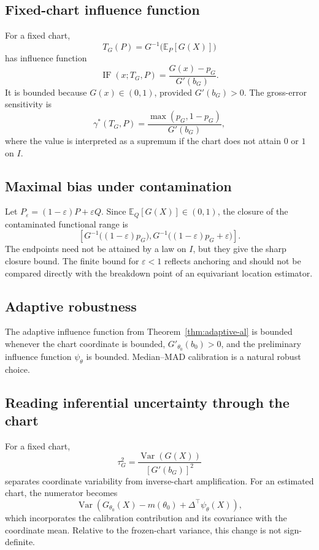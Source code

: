 \documentclass[11pt,a4paper]{article}
\theoremstyle{definition}
\newcommand{\E}{\mathbb{E}}
\newcommand{\Var}{\operatorname{Var}}
\newcommand{\IF}{\operatorname{IF}}
\begin{document}
\subsection{Fixed-chart influence function}

For a fixed chart,
\[
T_G(P)=G^{-1}\!\bigl(\E_P[G(X)]\bigr)
\]
has influence function
\[
\IF(x;T_G,P)
=
\frac{G(x)-p_G}{G'(b_G)}.
\]
It is bounded because $G(x)\in(0,1)$, provided $G'(b_G)>0$. The gross-error sensitivity is
\[
\gamma^*(T_G,P)
=
\frac{\max(p_G,1-p_G)}{G'(b_G)},
\]
where the value is interpreted as a supremum if the chart does not attain $0$ or $1$ on $I$.

\subsection{Maximal bias under contamination}

Let $P_\varepsilon=(1-\varepsilon)P+\varepsilon Q$. Since $\E_Q[G(X)]\in(0,1)$, the closure of the contaminated functional range is
\[
\left[
G^{-1}\!\bigl((1-\varepsilon)p_G\bigr),
G^{-1}\!\bigl((1-\varepsilon)p_G+\varepsilon\bigr)
\right].
\]
The endpoints need not be attained by a law on $I$, but they give the sharp closure bound. The finite bound for $\varepsilon<1$ reflects anchoring and should not be compared directly with the breakdown point of an equivariant location estimator.

\subsection{Adaptive robustness}

The adaptive influence function from Theorem~\ref{thm:adaptive-al} is bounded whenever the chart coordinate is bounded, $G'_{\theta_0}(b_0)>0$, and the preliminary influence function $\psi_\theta$ is bounded. Median--MAD calibration is a natural robust choice.

\subsection{Reading inferential uncertainty through the chart}

For a fixed chart,
\[
\tau_G^2
=
\frac{\Var(G(X))}{[G'(b_G)]^2}
\]
separates coordinate variability from inverse-chart amplification. For an estimated chart, the numerator becomes
\[
\Var\left(
G_{\theta_0}(X)-m(\theta_0)
+
\Delta^\top\psi_\theta(X)
\right),
\]
which incorporates the calibration contribution and its covariance with the coordinate mean. Relative to the frozen-chart variance, this change is not sign-definite.
\end{document}
